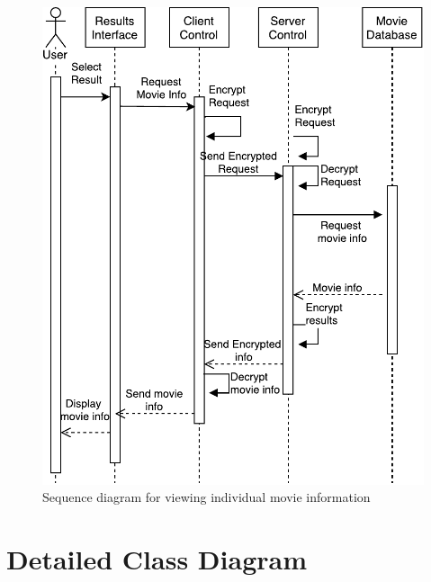 \documentclass[]{article}
\begin{document}
\begin{figure}[H]
	\includegraphics[width=\textwidth]{SD3}
	\centering
	\caption{Sequence diagram for viewing individual movie information}
\end{figure}

\section{Detailed Class Diagram}
\label{sec:detailed_class_diagram}
\end{document}
